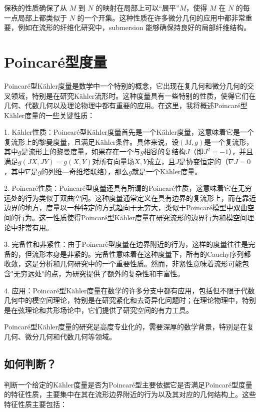 \documentclass[lang=cn,zihao=-4,a4paper,fontset=none]{beautybook}
\begin{document}
\begin{proposition}
\begin{itemize}
    保秩的性质确保了从 \( M \) 到 \( N \) 的映射在局部上可以“展平”\( M \)，使得 \( M \) 在 \( N \) 的每一点局部上都类似于 \( N \) 的一个开集。这种性质在许多微分几何的应用中都非常重要，例如在流形的纤维化研究中，submersion 能够确保持良好的局部纤维结构。
\end{itemize}
    \end{proposition}
        

    \section{Poincar\'e型度量}
    Poincaré型Kähler度量是数学中一个特别的概念，它出现在复几何和微分几何的交叉领域，特别是在研究Kähler流形时。这种度量具有一些特别的性质，使得它们在几何、代数几何以及理论物理中都有重要的应用。在这里，我将概述Poincaré型Kähler度量的一些关键性质：

1. Kähler性质：Poincaré型Kähler度量首先是一个Kähler度量，这意味着它是一个复流形上的黎曼度量，且满足Kähler条件。具体来说，设$(M, g)$是一个复流形，其中$g$是流形上的黎曼度量，如果存在一个与$g$相容的复结构$J$（即$J^2 = -1$），并且满足$g(JX, JY) = g(X, Y)$对所有向量场$X, Y$成立，且$J$是协变恒定的（$\nabla J = 0$，其中$\nabla$是$g$的列维—奇维塔联络），那么$g$就是一个Kähler度量。

2. Poincaré性质：Poincaré型度量还具有所谓的Poincaré性质，这意味着它在无穷远处的行为类似于双曲空间。这种度量通常定义在具有边界的复流形上，而在靠近边界的地方，度量以一种特定的方式趋向于无穷大，类似于Poincaré模型中双曲空间的行为。这一性质使得Poincaré型Kähler度量在研究流形的边界行为和模空间理论中非常有用。

3. 完备性和非紧性：由于Poincaré型度量在边界附近的行为，这样的度量往往是完备的，但流形本身是非紧的。完备性意味着在这种度量下，所有的Cauchy序列都收敛，这是分析和几何研究中的一个重要性质。然而，非紧性意味着流形可能包含"无穷远处"的点，为研究提供了额外的复杂性和丰富性。

4. 应用：Poincaré型Kähler度量在数学的许多分支中都有应用，包括但不限于代数几何中的模空间理论，特别是在研究紧化和去奇异化问题时；在理论物理中，特别是在弦理论和共形场论中，它们提供了研究空间的有力工具。

Poincaré型Kähler度量的研究是高度专业化的，需要深厚的数学背景，特别是在复几何、微分几何和代数几何等领域。

\subsection{如何判断？}
判断一个给定的Kähler度量是否为Poincaré型主要依据它是否满足Poincaré型度量的特征性质，主要集中在其在流形边界附近的行为以及其对应的几何结构上。这些特征性质主要包括：
\end{document}
